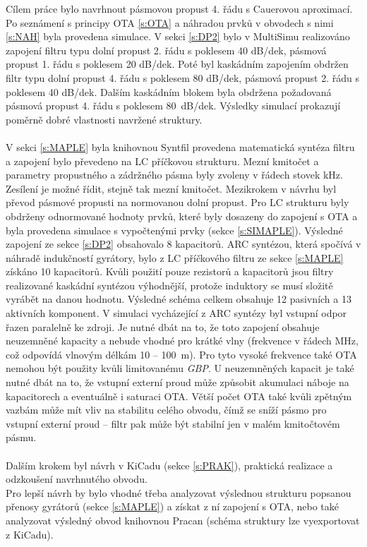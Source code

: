 \noindent Cílem práce bylo navrhnout pásmovou propust 4. řádu s Cauerovou aproximací. Po seznámení s principy OTA \ref{s:OTA} a náhradou prvků v obvodech s nimi \ref{s:NAH} byla provedena simulace. V sekci \ref{s:DP2} bylo v MultiSimu realizováno zapojení filtru typu dolní propust 2. řádu s poklesem 40 dB/dek, pásmová propust 1. řádu s poklesem 20 dB/dek. Poté byl kaskádním zapojením obdržen filtr typu dolní propust 4. řádu s poklesem 80 dB/dek, pásmová propust 2. řádu s poklesem 40 dB/dek. Dalším kaskádním blokem byla obdržena požadovaná pásmová propust 4. řádu s poklesem 80~dB/dek. Výsledky simulací prokazují poměrně dobré vlastnosti navržené struktury.\\
\\
V sekci \ref{s:MAPLE} byla knihovnou Syntfil provedena matematická syntéza filtru a zapojení bylo převedeno na LC příčkovou strukturu. Mezní kmitočet a parametry propustného a zádržného pásma byly zvoleny v řádech stovek kHz. Zesílení je možné řídit, stejně tak mezní kmitočet. Mezikrokem v návrhu byl převod pásmové propusti na normovanou dolní propust. Pro LC strukturu byly obdrženy odnormované hodnoty prvků, které byly dosazeny do zapojení s OTA a byla provedena simulace s vypočtenými prvky (sekce \ref{s:SIMAPLE}). Výsledné zapojení ze sekce \ref{s:DP2} obsahovalo 8 kapacitorů. ARC syntézou, která spočívá v náhradě indukčností gyrátory, bylo z LC příčkového filtru ze sekce \ref{s:MAPLE} získáno 10 kapacitorů. Kvůli použití pouze rezistorů a kapacitorů jsou filtry realizované kaskádní syntézou výhodnější, protože induktory se musí složitě vyrábět na danou hodnotu. Výsledné schéma celkem obsahuje 12 pasivních a 13 aktivních komponent. V simulaci vycházející z ARC syntézy byl vstupní odpor řazen paralelně ke zdroji. Je nutné dbát na to, že toto zapojení obsahuje neuzemněné kapacity a nebude vhodné pro krátké vlny (frekvence v řádech MHz, což odpovídá vlnovým délkám 10 -- 100~m). Pro tyto vysoké frekvence také OTA nemohou být použity kvůli limitovanému \textit{GBP}. U neuzemněných kapacit je také nutné dbát na to, že vstupní externí proud může způsobit akumulaci náboje na kapacitorech a eventuálně i saturaci OTA. Větší počet OTA také kvůli zpětným vazbám může mít vliv na stabilitu celého obvodu, čímž se sníží pásmo pro vstupní externí proud -- filtr pak může být stabilní jen v malém kmitočtovém pásmu.\\
\\
Dalším krokem byl návrh v KiCadu (sekce \ref{s:PRAK}), praktická realizace a odzkoušení navrhnutého obvodu.\\
Pro lepší návrh by bylo vhodné třeba analyzovat výslednou strukturu popsanou přenosy gyrátorů (sekce \ref{s:MAPLE}) a získat z ní zapojení s OTA, nebo také analyzovat výsledný obvod knihovnou Pracan (schéma struktury lze vyexportovat z KiCadu).
